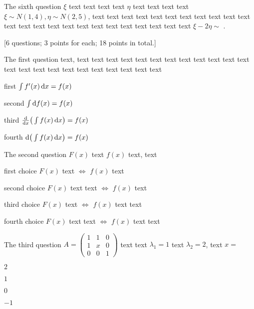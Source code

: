 \documentclass[12pt,math=all]{randexam}
\begin{document}
\bigskip

\begin{question}
The sixth question $\xi$ text text text text $\eta$ text text text text $\xi\sim N(1,4),
\eta\sim N(2,5)$, text text text text text text text text text text text text text text
text text text text text text text text text text $\xi-2\eta\sim$ .
\end{question}

\bigskip

\newpage

[6 questions; 3 points for each; 18 points in total.]

\answertable[total=6,column=6]

\begin{question}
The first question text, text text text text text text text text text text
text text text text text text text text text text text text text 
\begin{abcd}
\item first $\int f'(x)\mathop{}\!\mathrm{d} x=f(x)$
\item second $\int \d f(x)=f(x)$
\item third $\frac{\d}{\dx}\big(\int f(x)\dx\big)=f(x)$
\item fourth $\d\big(\int f(x)\dx\big)=f(x)$
\end{abcd}
\end{question}

\bigskip

\begin{question}
The second question $F(x)$ text $f(x)$ text, text 
\begin{abcd}
\item first choice $F(x)$ text $\Leftrightarrow$ $f(x)$ text
\item second choice $F(x)$ text text $\Leftrightarrow$ $f(x)$ text
\item third choice $F(x)$ text $\Leftrightarrow$ $f(x)$ text text
\item fourth choice $F(x)$ text text $\Leftrightarrow$ $f(x)$ text text
\end{abcd}
\end{question}

\bigskip

\begin{question}
The third question $A = \left(\begin{array}{ccc}
  1 & 1 & 0\\
  1 & x & 0\\
  0 & 0 & 1
\end{array}\right)$ text text $\lambda_1 = 1$ text $\lambda_2
= 2$, text $x=$ 
\begin{abcd}
\item $2$
\item $1$
\item $0$
\item $-1$
\end{abcd}
\end{question}
\end{document}
